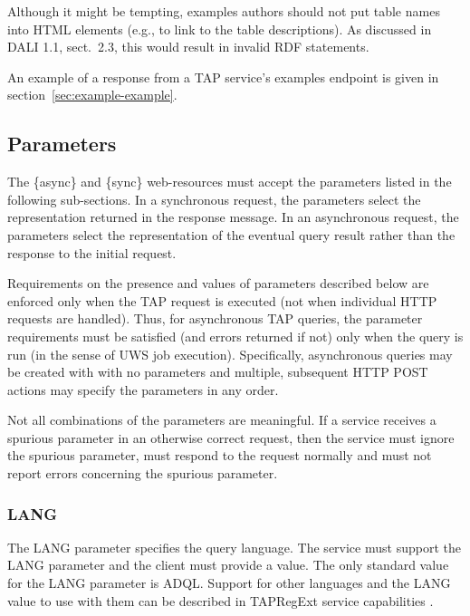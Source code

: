 \documentclass[11pt,letter]{ivoa}
\begin{document}
Although it might be tempting, examples authors should not put table
names into HTML  elements (e.g., to link to the table
descriptions).  As discussed in DALI 1.1, sect.~2.3, this would result
in invalid RDF statements.

An example of a response from a TAP service's examples endpoint is given
in section~\ref{sec:example-example}.

\subsection{Parameters}
\label{sec:parameters}

The \{async\} and \{sync\} web-resources must accept the parameters listed in 
the following sub-sections. In a synchronous request, the parameters select the 
representation returned in the response message. In an asynchronous request, the 
parameters select the representation of the eventual query result rather than 
the response to the initial request.

Requirements on the presence and values of parameters described below are 
enforced only when the TAP request is executed (not when individual HTTP 
requests are handled). Thus, for asynchronous TAP queries, the parameter 
requirements must be satisfied (and errors returned if not) only when the query 
is run (in the sense of UWS job execution). Specifically, asynchronous 
queries may be created with with no parameters and multiple, subsequent HTTP 
POST actions may specify the parameters in any order.

Not all combinations of the parameters are meaningful. If a 
service receives a spurious parameter in an otherwise correct request, then the 
service must ignore the spurious parameter, must respond to the request normally 
and must not report errors concerning the spurious parameter.

\subsubsection{LANG}
\label{sec:LANG}

The LANG parameter specifies the query language. The service must support the LANG 
parameter and the client must provide a value. The only standard 
value for the LANG parameter is ADQL. Support for other 
languages and the LANG value to use with them can be described in
TAPRegExt service 
capabilities \citep{2012ivoa.spec.0827D}.
\end{document}
